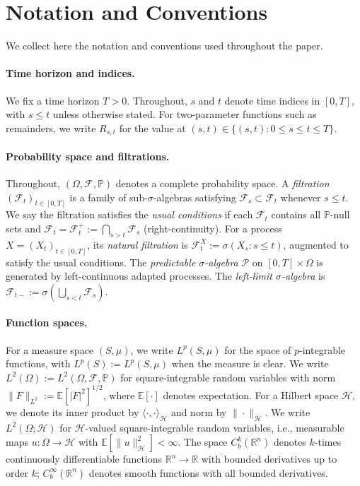 \documentclass[11pt,a4paper]{article}
\theoremstyle{plain}
\theoremstyle{definition}
\theoremstyle{remark}
\newcommand{\R}{\mathbb{R}}
\newcommand{\E}{\mathbb{E}}
\newcommand{\ip}[2]{\langle #1, #2 \rangle}
\newcommand{\norm}[1]{\| #1 \|}
\newcommand{\Prob}{\mathbb{P}}
\newcommand{\Lp}[1]{L^{#1}}
\newcommand{\Ft}{\mathcal{F}_t}
\newcommand{\Fs}{\mathcal{F}_s}
\newcommand{\Fminus}{\mathcal{F}_{t-}}
\begin{document}
\section{Notation and Conventions}\label{sec:notation}

We collect here the notation and conventions used throughout the paper.

\paragraph{Time horizon and indices.}
We fix a time horizon $T > 0$. Throughout, $s$ and $t$ denote time indices in $[0,T]$, with $s \leq t$ unless otherwise stated. For two-parameter functions such as remainders, we write $R_{s,t}$ for the value at $(s,t) \in \{(s,t) : 0 \leq s \leq t \leq T\}$.

\paragraph{Probability space and filtrations.}
Throughout, $(\Omega, \mathcal{F}, \Prob)$ denotes a complete probability space. A \emph{filtration} $(\Ft)_{t \in [0,T]}$ is a family of sub-$\sigma$-algebras satisfying $\Fs \subset \Ft$ whenever $s \leq t$. We say the filtration satisfies the \emph{usual conditions} if each $\Ft$ contains all $\Prob$-null sets and $\Ft = \Ft^+ := \bigcap_{s > t} \Fs$ (right-continuity). For a process $X = (X_t)_{t \in [0,T]}$, its \emph{natural filtration} is $\Ft^X := \sigma(X_s : s \leq t)$, augmented to satisfy the usual conditions. The \emph{predictable $\sigma$-algebra} $\mathcal{P}$ on $[0,T] \times \Omega$ is generated by left-continuous adapted processes. The \emph{left-limit $\sigma$-algebra} is $\Fminus := \sigma(\bigcup_{s < t} \Fs)$.

\paragraph{Function spaces.}
For a measure space $(S, \mu)$, we write $\Lp{p}(S, \mu)$ for the space of $p$-integrable functions, with $\Lp{p}(S) := \Lp{p}(S, \mu)$ when the measure is clear. We write $\Lp{2}(\Omega) := \Lp{2}(\Omega, \mathcal{F}, \Prob)$ for square-integrable random variables with norm $\norm{F}_{\Lp{2}} := \E[|F|^2]^{1/2}$, where $\E[\cdot]$ denotes expectation. For a Hilbert space $\mathcal{H}$, we denote its inner product by $\ip{\cdot}{\cdot}_{\mathcal{H}}$ and norm by $\norm{\cdot}_{\mathcal{H}}$. We write $\Lp{2}(\Omega; \mathcal{H})$ for $\mathcal{H}$-valued square-integrable random variables, i.e., measurable maps $u: \Omega \to \mathcal{H}$ with $\E[\norm{u}_{\mathcal{H}}^2] < \infty$. The space $C^k_b(\R^n)$ denotes $k$-times continuously differentiable functions $\R^n \to \R$ with bounded derivatives up to order $k$; $C^\infty_b(\R^n)$ denotes smooth functions with all bounded derivatives.
\end{document}
